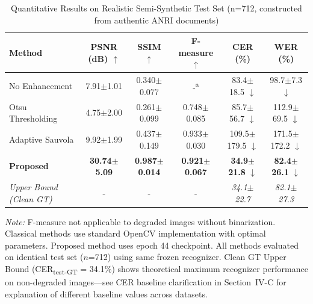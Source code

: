 \documentclass[journal]{IEEEtran}
\begin{document}
\begin{table}[!t]
\renewcommand{\arraystretch}{1.3}
\caption{Quantitative Results on Realistic Semi-Synthetic Test Set (n=712, constructed from authentic ANRI documents)}
\label{table_synthetic_results}
\centering
\begin{tabular}{|l|c|c|c|c|c|}
\hline
\textbf{Method} & \textbf{PSNR (dB) $\uparrow$} & \textbf{SSIM $\uparrow$} & \textbf{F-measure $\uparrow$} & \textbf{CER (\%)} & \textbf{WER (\%)} \\
\hline
No Enhancement & 7.91$\pm$1.01 & 0.340$\pm$0.077 & -\textsuperscript{a} & 83.4$\pm$18.5 $\downarrow$ & 98.7$\pm$7.3 $\downarrow$ \\
Otsu Thresholding & 4.75$\pm$2.00 & 0.261$\pm$0.099 & 0.748$\pm$0.085 & 85.7$\pm$56.7 $\downarrow$ & 112.9$\pm$69.5 $\downarrow$ \\
Adaptive Sauvola & 9.92$\pm$1.99 & 0.437$\pm$0.149 & 0.933$\pm$0.030 & 109.5$\pm$179.5 $\downarrow$ & 171.5$\pm$172.2 $\downarrow$ \\
\hline
\textbf{Proposed} & \textbf{30.74$\pm$5.09} & \textbf{0.987$\pm$0.014} & \textbf{0.921$\pm$0.067} & \textbf{34.9$\pm$21.8} $\downarrow$ & \textbf{82.4$\pm$26.1} $\downarrow$ \\
\hline
\textit{Upper Bound (Clean GT)} & - & - & - & \textit{34.1$\pm$22.7} & \textit{82.1$\pm$27.3} \\
\hline
\end{tabular}
\newline
\newline
\textit{Note:} F-measure not applicable to degraded images without binarization. Classical methods use standard OpenCV implementation with optimal parameters. Proposed method uses epoch 44 checkpoint. All methods evaluated on identical test set ($n$=712) using same frozen recognizer. Clean GT Upper Bound (CER\textsubscript{test-GT} = 34.1\%) shows theoretical maximum recognizer performance on non-degraded images---see CER baseline clarification in Section~IV-C for explanation of different baseline values across datasets.
\end{table}
\end{document}
